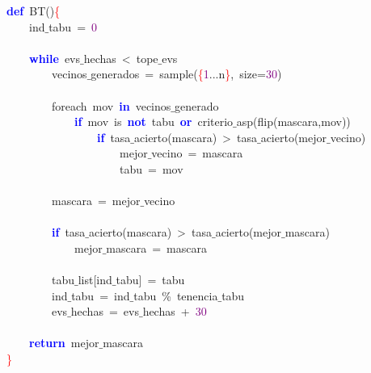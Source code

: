 \noindent
\mbox{}\textbf{\textcolor{Blue}{def}}\ BT\textcolor{BrickRed}{()}\textcolor{Red}{\{} \\
\mbox{}\ \ \ \ ind$\_$tabu\ \textcolor{BrickRed}{=}\ \textcolor{Purple}{0} \\
\mbox{} \\
\mbox{}\ \ \ \ \textbf{\textcolor{Blue}{while}}\ evs$\_$hechas\ \textcolor{BrickRed}{\textless{}}\ tope$\_$evs \\
\mbox{}\ \ \ \ \ \ \ \ vecinos$\_$generados\ \textcolor{BrickRed}{=}\ sample\textcolor{BrickRed}{(}\textcolor{Red}{\{}\textcolor{Purple}{1}\textcolor{BrickRed}{...}n\textcolor{Red}{\}}\textcolor{BrickRed}{,}\ size\textcolor{BrickRed}{=}\textcolor{Purple}{30}\textcolor{BrickRed}{)} \\
\mbox{} \\
\mbox{}\ \ \ \ \ \ \ \ foreach\ mov\ \textbf{\textcolor{Blue}{in}}\ vecinos$\_$generado \\
\mbox{}\ \ \ \ \ \ \ \ \ \ \ \ \textbf{\textcolor{Blue}{if}}\ mov\ is\ \textbf{\textcolor{Blue}{not}}\ tabu\ \textbf{\textcolor{Blue}{or}}\ criterio$\_$asp\textcolor{BrickRed}{(}flip\textcolor{BrickRed}{(}mascara\textcolor{BrickRed}{,}mov\textcolor{BrickRed}{))} \\
\mbox{}\ \ \ \ \ \ \ \ \ \ \ \ \ \ \ \ \textbf{\textcolor{Blue}{if}}\ tasa$\_$acierto\textcolor{BrickRed}{(}mascara\textcolor{BrickRed}{)}\ \textcolor{BrickRed}{\textgreater{}}\ tasa$\_$acierto\textcolor{BrickRed}{(}mejor$\_$vecino\textcolor{BrickRed}{)} \\
\mbox{}\ \ \ \ \ \ \ \ \ \ \ \ \ \ \ \ \ \ \ \ mejor$\_$vecino\ \textcolor{BrickRed}{=}\ mascara \\
\mbox{}\ \ \ \ \ \ \ \ \ \ \ \ \ \ \ \ \ \ \ \ tabu\ \textcolor{BrickRed}{=}\ mov \\
\mbox{} \\
\mbox{}\ \ \ \ \ \ \ \ mascara\ \textcolor{BrickRed}{=}\ mejor$\_$vecino \\
\mbox{} \\
\mbox{}\ \ \ \ \ \ \ \ \textbf{\textcolor{Blue}{if}}\ tasa$\_$acierto\textcolor{BrickRed}{(}mascara\textcolor{BrickRed}{)}\ \textcolor{BrickRed}{\textgreater{}}\ tasa$\_$acierto\textcolor{BrickRed}{(}mejor$\_$mascara\textcolor{BrickRed}{)} \\
\mbox{}\ \ \ \ \ \ \ \ \ \ \ \ mejor$\_$mascara\ \textcolor{BrickRed}{=}\ mascara \\
\mbox{} \\
\mbox{}\ \ \ \ \ \ \ \ tabu$\_$list\textcolor{BrickRed}{[}ind$\_$tabu\textcolor{BrickRed}{]}\ \textcolor{BrickRed}{=}\ tabu \\
\mbox{}\ \ \ \ \ \ \ \ ind$\_$tabu\ \textcolor{BrickRed}{=}\ ind$\_$tabu\ \textcolor{BrickRed}{\%}\ tenencia$\_$tabu \\
\mbox{}\ \ \ \ \ \ \ \ evs$\_$hechas\ \textcolor{BrickRed}{=}\ evs$\_$hechas\ \textcolor{BrickRed}{+}\ \textcolor{Purple}{30} \\
\mbox{} \\
\mbox{}\ \ \ \ \textbf{\textcolor{Blue}{return}}\ mejor$\_$mascara \\
\mbox{}\textcolor{Red}{\}} \\
\mbox{}
